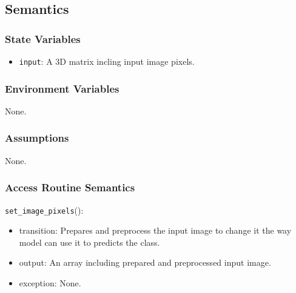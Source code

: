 \documentclass[12pt, titlepage]{article}
\def\code#1{\texttt{#1}}
\begin{document}
\subsection{Semantics}

\subsubsection{State Variables}
\begin{itemize}
  \item \code{input}: A 3D matrix incling input image pixels.
\end{itemize}

\subsubsection{Environment Variables}
None.

\subsubsection{Assumptions}
None.

\subsubsection{Access Routine Semantics}

\noindent \code{set\_image\_pixels}():
\begin{itemize}
  \item transition: Prepares and preprocess the input image to change it 
  the way model can use it to predicts the class.
  \item output: An array including prepared and preprocessed input image.
  \item exception: None.
\end{itemize}
\end{document}
